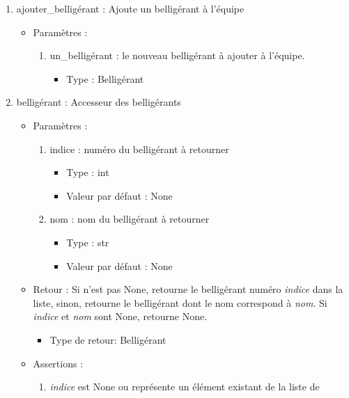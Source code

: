 \documentclass[12pt,pdftex,oneside]{article}
\begin{document}
\begin{itemize}
\begin{enumerate}
    \item ajouter\_belligérant : Ajoute un belligérant à l'équipe
      \begin{itemize}
      \item Paramètres : 
        \begin{enumerate}
        \item un\_belligérant : le nouveau belligérant à ajouter à l'équipe.
          \begin{itemize}
          \item Type : Belligérant
          \end{itemize}
        \end{enumerate}
      \end{itemize}
    \item belligérant : Accesseur des belligérants
      \begin{itemize}
      \item Paramètres : 
        \begin{enumerate}
        \item indice : numéro du belligérant à retourner
          \begin{itemize}
          \item Type : int
          \item Valeur par défaut : None
          \end{itemize}
        \item nom : nom du belligérant à retourner
          \begin{itemize}
          \item Type : str
          \item Valeur par défaut : None
          \end{itemize}
        \end{enumerate}
      \item Retour : Si  n'est pas None, retourne le belligérant numéro
        \emph{indice} dans la liste, sinon, retourne le belligérant dont le nom
        correspond à \emph{nom}. Si \emph{indice} et \emph{nom} sont None, retourne None.
          \begin{itemize}
          \item Type de retour: Belligérant
          \end{itemize}
      \item Assertions : 
        \begin{enumerate}
            \item \emph{indice} est None ou représente un élément existant de la liste de

\end{enumerate}
\end{itemize}
\end{enumerate}
\end{itemize}
\end{document}
